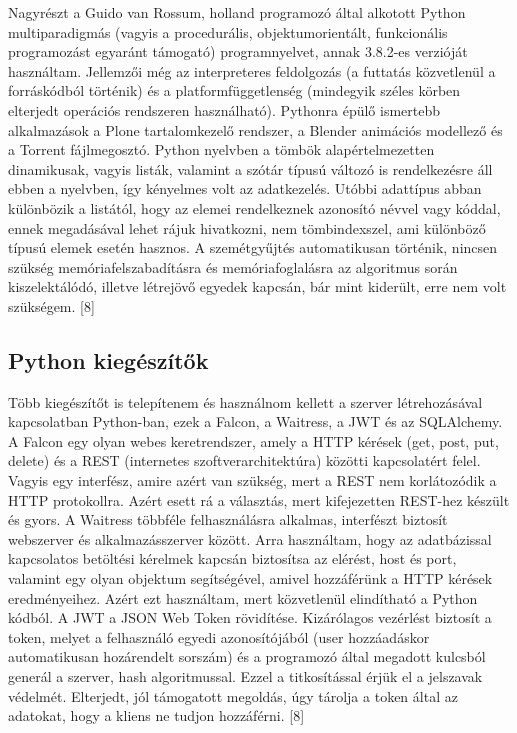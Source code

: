 \documentclass[12pt,a4paper]{report}
\begin{document}
Nagyrészt a Guido van Rossum, holland programozó által alkotott Python multiparadigmás 
(vagyis a procedurális, objektumorientált, funkcionális programozást egyaránt támogató)
programnyelvet, annak 3.8.2-es verzióját használtam. Jellemzői még az interpreteres 
feldolgozás (a futtatás közvetlenül a forráskódból történik) és a platformfüggetlenség 
(mindegyik széles körben elterjedt operációs rendszeren használható). Pythonra épülő
ismertebb alkalmazások a Plone tartalomkezelő rendszer, a Blender animációs modellező
és a Torrent fájlmegosztó. Python nyelvben a tömbök alapértelmezetten dinamikusak, vagyis
listák, valamint a szótár típusú változó is rendelkezésre áll ebben a nyelvben, így 
kényelmes volt az adatkezelés. Utóbbi adattípus abban különbözik a listától, hogy az 
elemei rendelkeznek azonosító névvel vagy kóddal, ennek megadásával lehet rájuk hivatkozni, 
nem tömbindexszel, ami különböző típusú elemek esetén hasznos. A szemétgyűjtés 
automatikusan történik, nincsen szükség memóriafelszabadításra és memóriafoglalásra az 
algoritmus során kiszelektálódó, illetve létrejövő egyedek kapcsán, bár mint kiderült,
erre nem volt szükségem. [8]

\subsection{Python kiegészítők}

Több kiegészítőt is telepítenem és használnom kellett a szerver létrehozásával kapcsolatban Python-ban, ezek a Falcon, a Waitress, a JWT és az SQLAlchemy. A Falcon egy olyan webes keretrendszer, amely a HTTP kérések (get, post, put, delete) és a REST (internetes szoftverarchitektúra) közötti  kapcsolatért felel. Vagyis egy interfész, amire azért van szükség, mert a REST nem korlátozódik a HTTP protokollra. Azért esett rá a választás, mert kifejezetten REST-hez készült és gyors. A Waitress többféle felhasználásra alkalmas, interfészt biztosít webszerver és alkalmazásszerver között. Arra használtam, hogy az adatbázissal kapcsolatos betöltési kérelmek kapcsán biztosítsa az elérést, host és port, valamint egy olyan objektum segítségével, amivel hozzáférünk a HTTP kérések eredményeihez. Azért ezt használtam, mert közvetlenül elindítható a Python kódból. A JWT a JSON Web Token rövidítése. Kizárólagos vezérlést biztosít a token, melyet a felhasználó egyedi azonosítójából (user hozzáadáskor automatikusan hozárendelt sorszám) és a programozó által megadott kulcsból generál a szerver, hash algoritmussal. Ezzel a titkosítással érjük el a jelszavak védelmét. Elterjedt, jól támogatott megoldás, úgy tárolja a token által az adatokat, hogy a kliens ne tudjon hozzáférni. [8]
\end{document}
